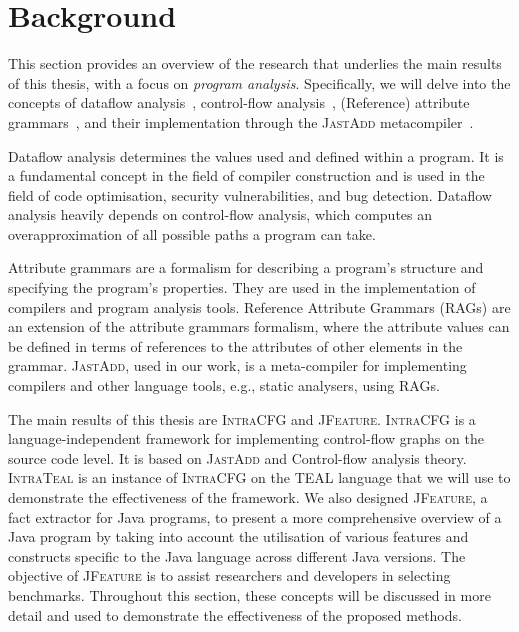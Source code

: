 \section{Background}
\label{sec:background}
This section provides an overview of the research that underlies the main results
of this thesis, with a focus on \emph{program analysis}. Specifically, we will delve into
the concepts of dataflow analysis~\cite{aho2007compilers,Nielson2010Principles},
control-flow analysis~\cite{allen1970control}, (Reference) attribute grammars~\cite{knuth1968semantics, DBLP:journals/informaticaSI/Hedin00},
and their implementation through the \textsc{JastAdd} metacompiler~\cite{DBLP:journals/entcs/HedinM01}.

Dataﬂow analysis determines the values used and deﬁned within a program. 
It is a fundamental concept in the field of compiler
construction and is used in the field of code optimisation, security vulnerabilities, and bug detection.
Dataflow analysis heavily depends on control-flow analysis, which computes an overapproximation of
all possible paths a program can take.

Attribute grammars are a formalism for describing a program's structure and 
specifying the program's properties. They are used in the implementation
of compilers and program analysis tools.
Reference Attribute Grammars (RAGs) are an extension of the attribute grammars formalism,
where the attribute values can be defined in terms of references to the attributes
of other elements in the grammar. \textsc{JastAdd}, used in our work, is a meta-compiler
for implementing compilers and other language tools, e.g., static analysers, using RAGs.

The main results of this thesis are \textsc{IntraCFG} and \textsc{JFeature}.
\textsc{IntraCFG} is a language-independent framework for implementing control-flow graphs
on the source code level.
It is based on \textsc{JastAdd} and Control-flow analysis theory. \textsc{IntraTeal} is an instance
of \textsc{IntraCFG} on the TEAL language that we will use to demonstrate the effectiveness
of the framework. We also designed \textsc{JFeature}, a fact extractor for Java programs,
to present a more comprehensive overview of a Java program by
taking into account the utilisation of various features and constructs specific
to the Java language across different Java versions. The objective of \textsc{JFeature} is
to assist researchers and developers in selecting benchmarks.
Throughout this section, these concepts will be discussed in more detail and used to
demonstrate the effectiveness of the proposed methods.

